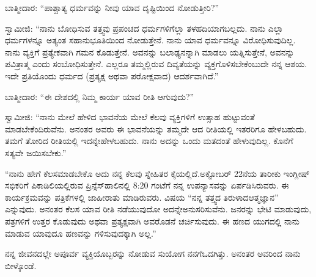 ಬಾತ್ಮೀದಾರ: “ಪಾಶ್ಚಾತ್ಯ ಧರ್ಮವನ್ನು ನೀವು ಯಾವ ದೃಷ್ಟಿಯಿಂದ ನೋಡುತ್ತೀರಿ?”

ಸ್ವಾಮೀಜಿ: “ನಾನು ಬೋಧಿಸುವ ತತ್ತ್ವವು ಪ್ರಪಂಚದ ಧರ್ಮಗಳಿಗೆಲ್ಲಾ ತಳಹದಿಯಾಗಬಲ್ಲದು. ನಾನು ಎಲ್ಲಾ ಧರ್ಮಗಳನ್ನೂ ಅತ್ಯಂತ ಸಹಾನುಭೂತಿಯಿಂದ ನೋಡುತ್ತೇನೆ. ನಾನು ಯಾವ ಧರ್ಮವನ್ನೂ ವಿರೋಧಿಸುವುದಿಲ್ಲ. ನಾನು ವ್ಯಕ್ತಿಗೆ ಪ್ರತ್ಯೇಕವಾಗಿ ಗಮನ ಕೊಡುತ್ತೇನೆ. ಅವನನ್ನು ಬಲಾಢ್ಯನನ್ನಾಗಿ ಮಾಡಲು ಯತ್ನಿಸುತ್ತೇನೆ, ಅವನನ್ನು ಪವಿತ್ರಾತ್ಮ ಎಂದು ಸಂಬೋಧಿಸುತ್ತೇನೆ. ಎಲ್ಲರೂ ತಮ್ಮಲ್ಲಿರುವ ದಿವ್ಯತೆಯನ್ನು ವ್ಯಕ್ತಗೊಳಿಸಬೇಕೆಂಬುದೇ ನನ್ನ ಆಶಯ. ಇದೇ ಪ್ರತಿಯೊಂದು ಧರ್ಮದ (ಪ್ರತ್ಯಕ್ಷ ಅಥವಾ ಪರೋಕ್ಷವಾದ) ಆದರ್ಶವಾಗಿದೆ.”

ಬಾತ್ಮೀದಾರ: “ಈ ದೇಶದಲ್ಲಿ ನಿಮ್ಮ ಕಾರ್ಯ ಯಾವ ರೀತಿ ಆಗುವುದು?”

ಸ್ವಾಮೀಜಿ: “ನಾನು ಮೇಲೆ ಹೇಳಿದ ಭಾವನೆಯ ಮೇಲೆ ಕೆಲವು ವ್ಯಕ್ತಿಗಳಿಗೆ ಉತ್ಸಾಹ ಹುಟ್ಟುವಂತೆ ಮಾಡಬೇಕೆಂದಿರುವೆನು. ಅನಂತರ ಅವರು ಈ ಭಾವನೆಯನ್ನು ತಮ್ಮದೇ ಆದ ರೀತಿಯಲ್ಲಿ ಇತರರಿಗೂ ಹೇಳಬಹುದು. ತಮಗೆ ತೋರಿದ ರೀತಿಯಲ್ಲಿ ಇದನ್ನೇ\break ಹೇಳಬಹುದು. ನಾನು ಅದನ್ನು ಒಂದು ಮತದಂತೆ ಹೇಳುವುದಿಲ್ಲ. ಕೊನೆಗೆ ಸತ್ಯವೇ ಜಯಿಸಬೇಕು.”

“ನಾನು ಹೇಗೆ ಕೆಲಸಮಾಡಬೇಕೊ ಅದು ನನ್ನ ಕೆಲವು ಸ್ನೇಹಿತರ ಕೈಯಲ್ಲಿದೆ.\break ಅಕ್ಟೋಬರ್​ 22ನೆಯ ತಾರೀಕು ಇಂಗ್ಲೀಷ್​ ಸಭಿಕರಿಗೆ ಪಿಕಾಡಿಲಿಯಲ್ಲಿರುವ ಪ್ರಿನ್ಸೆಸ್​\break ಹಾಲಿನಲ್ಲಿ 8:20 ಗಂಟೆಗೆ ನನ್ನ ಉಪನ್ಯಾಸವನ್ನು ಏರ್ಪಡಿಸಿರುವರು. ಈ ಕಾರ್ಯಕ್ರಮವನ್ನು ಪತ್ರಿಕೆಗಳಲ್ಲಿ ಜಾಹೀರಾತು ಮಾಡಿರುವರು. ವಿಷಯ “ನನ್ನ ತತ್ತ್ವದ ತಿರುಳಾದ\break ಆತ್ಮಜ್ಞಾನ” ಎನ್ನುವುದು. ಅನಂತರ ಕೆಲಸ ಯಾವ ರೀತಿ ನಡೆಯುವುದೋ ಅದನ್ನೇ\break ಅನುಸರಿಸುವೆನು. ಜನರನ್ನು ಭೇಟಿ ಮಾಡುವುದು, ಪತ್ರಗಳಿಗೆ ಉತ್ತರ ಕೊಡುವುದು ಅಥವಾ ಪ್ರತ್ಯಕ್ಷವಾಗಿ ಅವರೊಡನೆ ಚರ್ಚಿಸುವುದು. ಈ ಹಣದ ಯುಗದಲ್ಲಿ ನಾನು ಮಾಡುವ ಯಾವುದೂ ಹಣವನ್ನು ಗಳಿಸುವುದಕ್ಕಾಗಿ ಅಲ್ಲ.”

ನನ್ನ ಜೀವನದಲ್ಲೇ ಅಪೂರ್ವ ವ್ಯಕ್ತಿಯೊಬ್ಬರನ್ನು ನೋಡುವ ಸುಯೋಗ ನನಗೆ\break ಒದಗಿತ್ತು. ಅನಂತರ ಅವರಿಂದ ನಾನು ಬೀಳ್ಕೊಂಡೆ.

